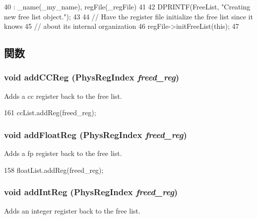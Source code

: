 \begin{DoxyCode}
40     : _name(_my_name), regFile(_regFile)
41 {
42     DPRINTF(FreeList, "Creating new free list object.\n");
43 
44     // Have the register file initialize the free list since it knows
45     // about its internal organization
46     regFile->initFreeList(this);
47 }
\end{DoxyCode}


\subsection{関数}
\hypertarget{classUnifiedFreeList_a0ef20ae376cb3c93b4cd8dd36ecb517b}{
\subsubsection[{addCCReg}]{\setlength{\rightskip}{0pt plus 5cm}void addCCReg ({\bf PhysRegIndex} {\em freed\_\-reg})}}
\label{classUnifiedFreeList_a0ef20ae376cb3c93b4cd8dd36ecb517b}
Adds a cc register back to the free list. 


\begin{DoxyCode}
161 { ccList.addReg(freed_reg); }
\end{DoxyCode}
\hypertarget{classUnifiedFreeList_a834c16ded33f7882b59ab88e6352b0a3}{
\subsubsection[{addFloatReg}]{\setlength{\rightskip}{0pt plus 5cm}void addFloatReg ({\bf PhysRegIndex} {\em freed\_\-reg})}}
\label{classUnifiedFreeList_a834c16ded33f7882b59ab88e6352b0a3}
Adds a fp register back to the free list. 


\begin{DoxyCode}
158 { floatList.addReg(freed_reg); }
\end{DoxyCode}
\hypertarget{classUnifiedFreeList_afdfc8a96dd61086f602fdb1b099aee55}{
\subsubsection[{addIntReg}]{\setlength{\rightskip}{0pt plus 5cm}void addIntReg ({\bf PhysRegIndex} {\em freed\_\-reg})}}
\label{classUnifiedFreeList_afdfc8a96dd61086f602fdb1b099aee55}
Adds an integer register back to the free list. 


